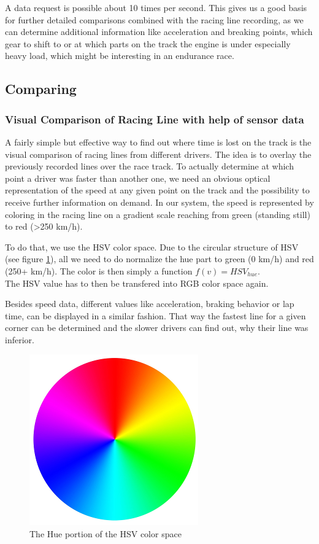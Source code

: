 A data request is possible about 10 times per second. This gives us a good basis for further detailed comparisons combined with the racing line recording, as we can determine additional information like acceleration and breaking points, which gear to shift to or at which parts on the track the engine is under especially heavy load, which might be interesting in an endurance race.

\subsection{Comparing}
\subsubsection{Visual Comparison of Racing Line with help of sensor data}
A fairly simple but effective way to find out where time is lost on the track is the visual comparison of racing lines from different drivers. The idea is to overlay the previously recorded lines over the race track. To actually determine at which point a driver was faster than another one, we need an obvious optical representation of the speed at any given point on the track and the possibility to receive further information on demand.
In our system, the speed is represented by coloring in the racing line on a gradient scale reaching from green (standing still) to red (>250 km/h).

To do that, we use the HSV color space. Due to the circular structure of HSV (see figure \ref{fig:hsv_gradient}), all we need to do normalize the hue part to green (0 km/h) and red (250+ km/h). The color is then simply a function $f(v) = HSV_{hue}$.\\
The HSV value has to then be transfered into RGB color space again.

Besides speed data, different values like acceleration, braking behavior or lap time, can be displayed in a similar fashion. That way the fastest line for a given corner can be determined and the slower drivers can find out, why their line was inferior.

\begin{figure}[!ht]
\centering
\includegraphics[width=.3\textwidth]{gradient_hsv}
\caption{The Hue portion of the HSV color space}
\label{fig:hsv_gradient}
\end{figure}

